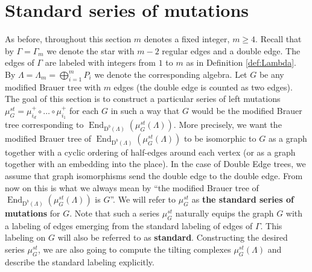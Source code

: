 \documentclass[12pt]{amsart}
\theoremstyle{plain}
\theoremstyle{remark}
\theoremstyle{definition}
\newcommand{\End}{\mathop{\mathrm{End}}\nolimits}
\newcommand{\D}{{\mathrm{D}}}
\begin{document}
\section{Standard series of mutations}\label{sec:stmut}
 As before, throughout this section $m$ denotes a fixed integer, $m \geq 4$. Recall that by $\Gamma = \Gamma_m$ we denote the star with $m-2$ regular edges and a double edge. The edges of $\Gamma$ are labeled with integers from $1$ to $m$ as in Definition \ref{def:Lambda}. By $\Lambda = \Lambda_m =  \bigoplus_{i=1}^m P_i$ we denote the corresponding algebra. Let $G$ be any modified Brauer tree with $m$ edges (the double edge is counted as two edges). The goal of this section is to construct a particular series of left mutations $\mu_G^{st} = \mu_{i_d}^+ \circ \dots \circ\mu_{i_1}^+$ for each $G$ in such a way that $G$ would be the modified Brauer tree corresponding to $\End_{\D^b(\Lambda)}(\mu_G^{st}(\Lambda))$. More precisely, we want the modified Brauer tree of $\End_{\D^b(\Lambda)}(\mu_G^{st}(\Lambda))$ to be isomorphic to $G$ as a graph together with a cyclic ordering of half-edges around each vertex (or as a graph together with an embedding into the place). In the case of Double Edge trees, we assume that graph isomorphisms send the double edge to the double edge. From now on this is what we always mean by ``the modified Brauer tree of $\End_{\D^b(\Lambda)}(\mu_G^{st}(\Lambda))$ is $G$''. We will refer to $\mu_G^{st}$ as {\bf the standard series of mutations} for $G$. Note that such a series $\mu_G^{st}$ naturally equips the graph $G$ with a labeling of edges emerging from the standard labeling of edges of $\Gamma$. This labeling on $G$ will also be referred to as {\bf standard}. Constructing the desired series $\mu_G^{st}$, we are also going to compute the tilting complexes $\mu_G^{st}(\Lambda)$ and describe the standard labeling explicitly.  
 
\end{document}
